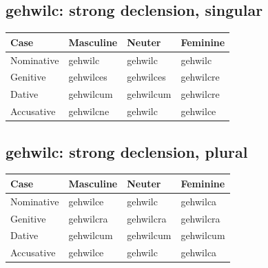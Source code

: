 \subsection*{gehwilc: strong declension, singular}

\par\begingroup
\fontsize{10.5}{13.2}\selectfont
\setlength{\LTleft}{0pt}\setlength{\LTright}{\fill}
\noindent
\begin{tabular}{@{}>{\raggedright\arraybackslash}p{28.89mm}>{\raggedright\arraybackslash}p{28.89mm}>{\raggedright\arraybackslash}p{28.89mm}>{\raggedright\arraybackslash}p{28.89mm}@{}}
\toprule
\textbf{Case} & \textbf{Masculine} & \textbf{Neuter} & \textbf{Feminine} \\
\midrule
Nominative & gehwilc & gehwilc & gehwilc \\
Genitive & gehwilces & gehwilces & gehwilcre \\
Dative & gehwilcum & gehwilcum & gehwilcre \\
Accusative & gehwilcne & gehwilc & gehwilce \\
\bottomrule
\end{tabular}
\par\endgroup

\subsection*{gehwilc: strong declension, plural}

\par\begingroup
\fontsize{10.5}{13.2}\selectfont
\setlength{\LTleft}{0pt}\setlength{\LTright}{\fill}
\noindent
\begin{tabular}{@{}>{\raggedright\arraybackslash}p{28.89mm}>{\raggedright\arraybackslash}p{28.89mm}>{\raggedright\arraybackslash}p{28.89mm}>{\raggedright\arraybackslash}p{28.89mm}@{}}
\toprule
\textbf{Case} & \textbf{Masculine} & \textbf{Neuter} & \textbf{Feminine} \\
\midrule
Nominative & gehwilce & gehwilc & gehwilca \\
Genitive & gehwilcra & gehwilcra & gehwilcra \\
Dative & gehwilcum & gehwilcum & gehwilcum \\
Accusative & gehwilce & gehwilc & gehwilca \\
\bottomrule
\end{tabular}
\par\endgroup

